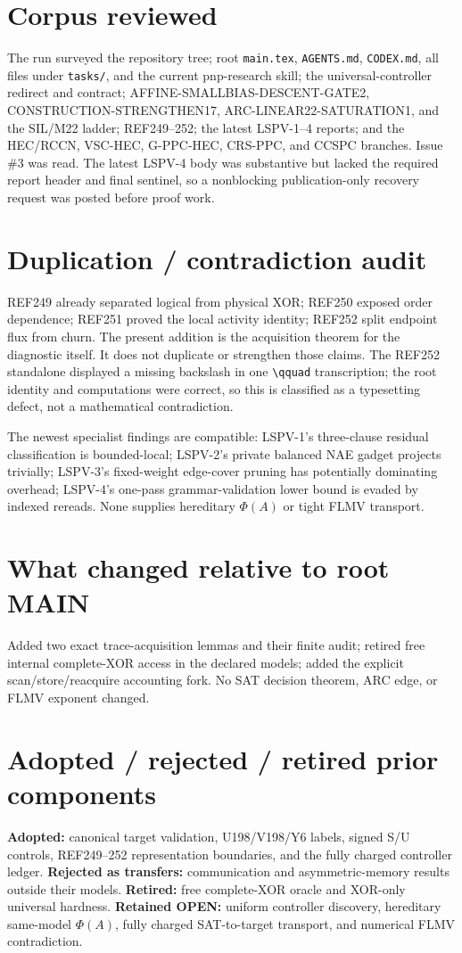 \documentclass[11pt]{article}
\begin{document}
\section{Corpus reviewed}
The run surveyed the repository tree; root \texttt{main.tex}, \texttt{AGENTS.md}, \texttt{CODEX.md}, all files under \texttt{tasks/}, and the current pnp-research skill; the universal-controller redirect and contract; AFFINE-SMALLBIAS-DESCENT-GATE2, CONSTRUCTION-STRENGTHEN17, ARC-LINEAR22-SATURATION1, and the SIL/M22 ladder; REF249--252; the latest LSPV-1--4 reports; and the HEC/RCCN, VSC-HEC, G-PPC-HEC, CRS-PPC, and CCSPC branches.  Issue \#3 was read.  The latest LSPV-4 body was substantive but lacked the required report header and final sentinel, so a nonblocking publication-only recovery request was posted before proof work.

\section{Duplication / contradiction audit}
REF249 already separated logical from physical XOR; REF250 exposed order dependence; REF251 proved the local activity identity; REF252 split endpoint flux from churn.  The present addition is the acquisition theorem for the diagnostic itself.  It does not duplicate or strengthen those claims.  The REF252 standalone displayed a missing backslash in one \verb|\qquad| transcription; the root identity and computations were correct, so this is classified as a typesetting defect, not a mathematical contradiction.

The newest specialist findings are compatible: LSPV-1's three-clause residual classification is bounded-local; LSPV-2's private balanced NAE gadget projects trivially; LSPV-3's fixed-weight edge-cover pruning has potentially dominating overhead; LSPV-4's one-pass grammar-validation lower bound is evaded by indexed rereads.  None supplies hereditary $\Phi(A)$ or tight FLMV transport.

\section{What changed relative to root MAIN}
Added two exact trace-acquisition lemmas and their finite audit; retired free internal complete-XOR access in the declared models; added the explicit scan/store/reacquire accounting fork.  No SAT decision theorem, ARC edge, or FLMV exponent changed.

\section{Adopted / rejected / retired prior components}
\textbf{Adopted:} canonical target validation, U198/V198/Y6 labels, signed S/U controls, REF249--252 representation boundaries, and the fully charged controller ledger.  \textbf{Rejected as transfers:} communication and asymmetric-memory results outside their models.  \textbf{Retired:} free complete-XOR oracle and XOR-only universal hardness.  \textbf{Retained OPEN:} uniform controller discovery, hereditary same-model $\Phi(A)$, fully charged SAT-to-target transport, and numerical FLMV contradiction.
\end{document}

